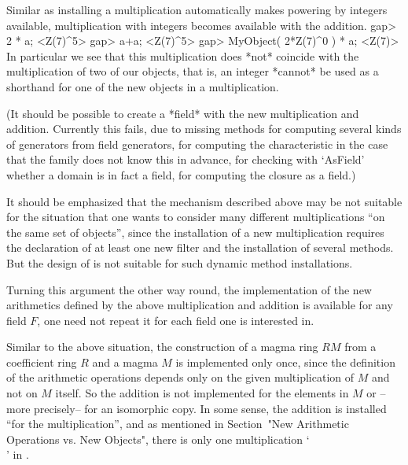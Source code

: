 Similar as installing a multiplication automatically makes
powering by integers available,
multiplication with integers becomes available with the addition.
\begintt
gap> 2 * a;
<Z(7)^5>
gap> a+a;
<Z(7)^5>
gap> MyObject( 2*Z(7)^0 ) * a;
<Z(7)>
\endtt
In particular we see that this multiplication does *not* coincide
with the multiplication of two of our objects,
that is, an integer *cannot* be used as a shorthand for one of the
new objects in a multiplication.

(It should be possible to create a *field* with the new multiplication
and addition.
Currently this fails, due to missing methods for computing
several kinds of generators from field generators,
for computing the characteristic in the case that the family does not
know this in advance,
for checking with `AsField' whether a domain is in fact a field,
for computing the closure as a field.)

It should be emphasized that the mechanism described above may be not
suitable for the situation that one wants to consider many different
multiplications ``on the same set of objects'',
since the installation of a new multiplication requires the declaration
of at least one new filter and the installation of several methods.
But the design of {\GAP} is not suitable for such dynamic method
installations.

Turning this argument the other way round,
the implementation of the new arithmetics defined by the above
multiplication and addition is available for any field $F$,
one need not repeat it for each field one is interested in.

Similar to the above situation,
the construction of a magma ring $RM$ from a coefficient ring $R$
and a magma $M$ is implemented only once,
since the definition of the arithmetic operations depends only on the
given multiplication of $M$ and not on $M$ itself.
So the addition is not implemented for the elements in $M$ or
--more precisely-- for an isomorphic copy.
In some sense, the addition is installed ``for the multiplication'',
and as mentioned in Section~"New Arithmetic Operations vs. New Objects",
there is only one multiplication `\\\*' in {\GAP}.



